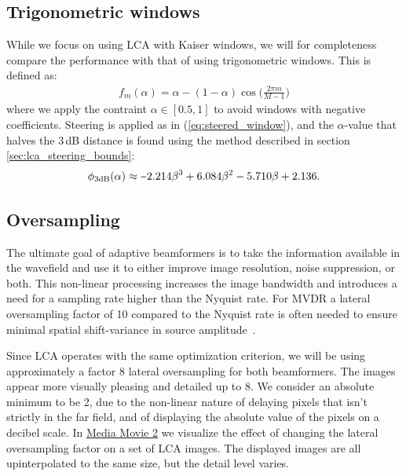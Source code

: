 \documentclass[10pt,journal,draftclsnofoot,onecolumn]{IEEEtran}
\newcounter{todoidx}
\newlength\marginparwidthsmall
\newcommand\todo[1]{%
      \addtocounter{todoidx}{1}%
      {\color{Red}\bf(\thetodoidx{})}%
      \marginpar{%
         {\vspace*{-10pt}\color{Red}\fbox{\bf\thetodoidx{}}}\\%
         \fcolorbox{red}{todobackground}{\parbox{\marginparwidthsmall}{\raggedright\scriptsize #1}}}}
\newcommand\todo[1]{}
\newcommand\1{\vec 1}
\newcommand\minus{\scalebox{0.75}[1.0]{$-$}}
\newcommand\multimedia[2]{\href{#1}{#2}}
\newcommand\mediaPath{gfx/media}
\newcommand\mediaII{\multimedia{\mediaPath/media2.mp4}{Media Movie 2}}
\begin{document}
\subsection{Trigonometric windows}\label{sec:lca_trigonometric}

While we focus on using LCA with Kaiser windows, we will for completeness compare the performance with that of using trigonometric windows. This is defined as:
%
\begin{align}
f_m(\alpha) = \alpha - (1-\alpha)\cos\Big(\frac{2\pi m}{M-1}\Big)\label{eq:trig_window_function}
\end{align}
%
where we apply the contraint $\alpha\in[0.5,1]$ to avoid windows with negative coefficients. Steering is applied as in (\ref{eq:steered_window}), and the $\alpha$-value that halves the 3\,dB distance is found using the method described in section \ref{sec:lca_steering_bounds}:
%
\begin{align}
\phi_\text{3dB}(\alpha) \approx \minus{}2.214\beta^3 + 6.084\beta^2 - 5.710\beta + 2.136.
\end{align}


\subsection{Oversampling}\label{sec:lca_oversampling}

The ultimate goal of adaptive beamformers is to take the information available in the wavefield and use it to either improve image resolution, noise suppression, or both. This non-linear processing increases the image bandwidth and introduces a need for a sampling rate higher than the Nyquist rate. For MVDR a lateral oversampling factor of 10 compared to the Nyquist rate is often needed to ensure minimal spatial shift-variance in source amplitude~\cite{Asen2014}.

Since LCA operates with the same optimization criterion, we will be using approximately a factor 8 lateral oversampling for both beamformers. The images appear more visually pleasing and detailed up to 8. We consider an absolute minimum to be 2, due to the non-linear nature of delaying pixels that isn't strictly in the far field, and of displaying the absolute value of the pixels on a decibel scale. In \mediaII{} we visualize the effect of changing the lateral oversampling factor on a set of LCA images. The displayed images are all upinterpolated to the same size, but the detail level varies. 
% 
\end{document}

